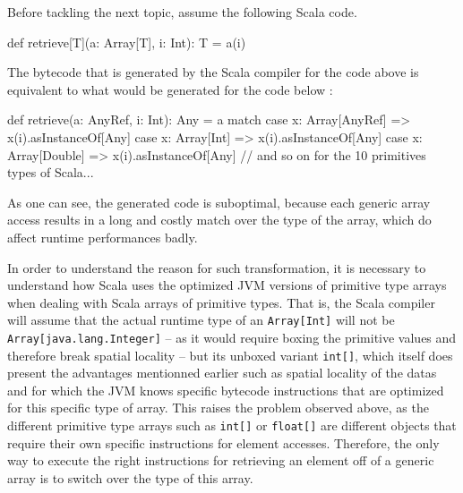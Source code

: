 
Before tackling the next topic, assume the following Scala code.

\begin{lstlisting-nobreak}
  def retrieve[T](a: Array[T], i: Int): T = {
    a(i)
  }
\end{lstlisting-nobreak}

The bytecode that is generated by the Scala compiler for the code above is equivalent to what would be generated for the code below :

\begin{lstlisting-nobreak}
  def retrieve(a: AnyRef, i: Int): Any = {
    a match {
      case x: Array[AnyRef] => x(i).asInstanceOf[Any]
      case x: Array[Int] => x(i).asInstanceOf[Any]
      case x: Array[Double] => x(i).asInstanceOf[Any]
      // and so on for the 10 primitives types of Scala...
    }
  }
\end{lstlisting-nobreak}

As one can see, the generated code is suboptimal, because each generic array access results in a long and costly match over the type of the array, which do affect runtime performances badly.


In order to understand the reason for such transformation, it is necessary to understand how Scala uses the optimized JVM versions of primitive type arrays when dealing with Scala arrays of primitive types. That is, the Scala compiler will assume that the actual runtime type of an \lstinline|Array[Int]| will not be \lstinline|Array[java.lang.Integer]| -- as it would require boxing the primitive values and therefore break spatial locality -- but its unboxed variant \lstinline|int[]|, which itself does present the advantages mentionned earlier such as spatial locality of the datas and for which the JVM knows specific bytecode instructions that are optimized for this specific type of array. This raises the problem observed above, as the different primitive type arrays such as \lstinline|int[]| or \lstinline|float[]| are different objects that require their own specific instructions for element accesses. Therefore, the only way to execute the right instructions for retrieving an element off of a generic array is to switch over the type of this array.


